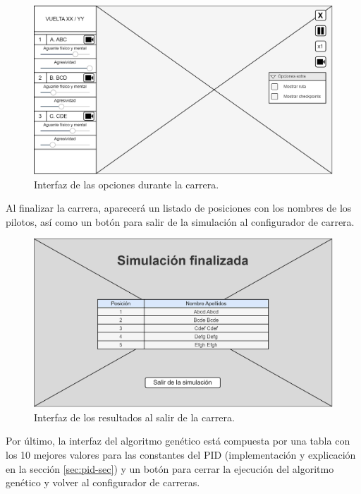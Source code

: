 \begin{figure}[H]
    \centering
    \includegraphics[width=\textwidth]{imagenes/pag2.png}
    \caption{Interfaz de las opciones durante la carrera.}
    \label{fig:boc-ui-race}
\end{figure}

Al finalizar la carrera, aparecerá un listado de posiciones con los nombres de los pilotos, así como un botón para salir de la simulación al configurador de carrera.

\begin{figure}[H]
    \centering
    \includegraphics[width=\textwidth]{imagenes/pantallafinal.png}
    \caption{Interfaz de los resultados al salir de la carrera.}
    \label{fig:resultados-sim}
\end{figure}

\newpage

Por último, la interfaz del algoritmo genético está compuesta por una tabla con los 10 mejores valores para las constantes del PID (implementación y explicación en la sección \ref{sec:pid-sec}) y un botón para cerrar la ejecución del algoritmo genético y volver al configurador de carreras.

